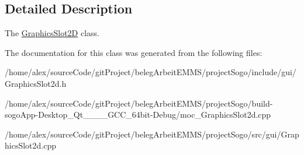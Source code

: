 \subsection{Detailed Description}
The \hyperlink{classGraphicsSlot2D}{Graphics\-Slot2\-D} class. 

The documentation for this class was generated from the following files\-:\begin{DoxyCompactItemize}
\item 
/home/alex/source\-Code/git\-Project/beleg\-Arbeit\-E\-M\-M\-S/project\-Sogo/include/gui/Graphics\-Slot2d.\-h\item 
/home/alex/source\-Code/git\-Project/beleg\-Arbeit\-E\-M\-M\-S/project\-Sogo/build-\/sogo\-App-\/\-Desktop\-\_\-\-Qt\-\_\-\_\-\_\-\_\-\-G\-C\-C\-\_\-64bit-\/\-Debug/moc\-\_\-\-Graphics\-Slot2d.\-cpp\item 
/home/alex/source\-Code/git\-Project/beleg\-Arbeit\-E\-M\-M\-S/project\-Sogo/src/gui/Graphics\-Slot2d.\-cpp\end{DoxyCompactItemize}
